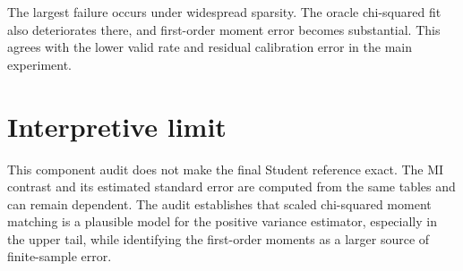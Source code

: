 \begin{table}[htbp]
\centering
\caption{First-order and oracle scaled chi-squared diagnostics by regime.}
\label{tab:appendix-scaled-chi-regime}
\small
{}
\end{table}

The largest failure occurs under widespread sparsity. The oracle
chi-squared fit also deteriorates there, and first-order moment error becomes
substantial. This agrees with the lower valid rate and residual calibration
error in the main experiment.

\section{Interpretive limit}

This component audit does not make the final Student reference exact. The MI
contrast and its estimated standard error are computed from the same tables
and can remain dependent. The audit establishes that scaled chi-squared
moment matching is a plausible model for the positive variance estimator,
especially in the upper tail, while identifying the first-order moments as a
larger source of finite-sample error.
